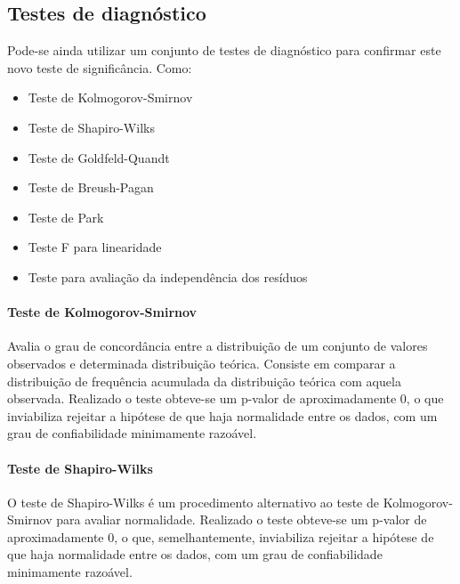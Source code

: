 \documentclass[
  letterpaper,
]{report}
\let\oldparagraph\paragraph
\renewcommand{\paragraph}[1]{\oldparagraph{#1}\mbox{}}
\providecommand{\tightlist}{%
  \setlength{\itemsep}{0pt}\setlength{\parskip}{0pt}}\usepackage{longtable,booktabs,array}
\begin{document}
\hypertarget{testes-de-diagnuxf3stico}{%
\subsection{Testes de diagnóstico}\label{testes-de-diagnuxf3stico}}

Pode-se ainda utilizar um conjunto de testes de diagnóstico para
confirmar este novo teste de significância. Como:

\begin{itemize}
\tightlist
\item
  Teste de Kolmogorov-Smirnov\\
\item
  Teste de Shapiro-Wilks\\
\item
  Teste de Goldfeld-Quandt\\
\item
  Teste de Breush-Pagan\\
\item
  Teste de Park\\
\item
  Teste F para linearidade\\
\item
  Teste para avaliação da independência dos resíduos\\
\end{itemize}

\hypertarget{teste-de-kolmogorov-smirnov}{%
\paragraph{Teste de
Kolmogorov-Smirnov}\label{teste-de-kolmogorov-smirnov}}

Avalia o grau de concordância entre a distribuição de um conjunto de
valores observados e determinada distribuição teórica. Consiste em
comparar a distribuição de frequência acumulada da distribuição teórica
com aquela observada. Realizado o teste obteve-se um p-valor de
aproximadamente 0, o que inviabiliza rejeitar a hipótese de que haja
normalidade entre os dados, com um grau de confiabilidade minimamente
razoável.

\hypertarget{teste-de-shapiro-wilks}{%
\paragraph{Teste de Shapiro-Wilks}\label{teste-de-shapiro-wilks}}

O teste de Shapiro-Wilks é um procedimento alternativo ao teste de
Kolmogorov-Smirnov para avaliar normalidade. Realizado o teste obteve-se
um p-valor de aproximadamente 0, o que, semelhantemente, inviabiliza
rejeitar a hipótese de que haja normalidade entre os dados, com um grau
de confiabilidade minimamente razoável.
\end{document}
